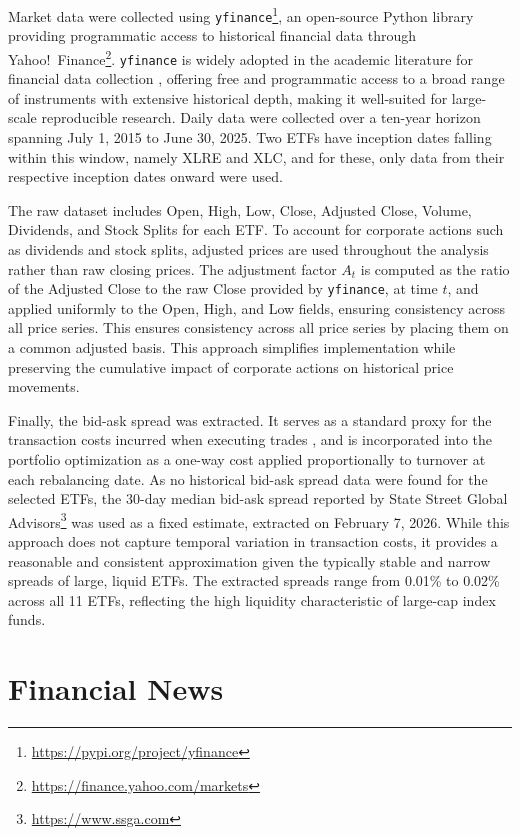 Market data were collected using \texttt{yfinance}\footnote{\url{https://pypi.org/project/yfinance}}, an open-source Python library providing programmatic access to historical financial data through Yahoo!\ Finance\footnote{\url{https://finance.yahoo.com/markets}}. \texttt{yfinance} is widely adopted in the academic literature for financial data collection \cite{e6ca3, 93d76, b58bb}, offering free and programmatic access to a broad range of instruments with extensive historical depth, making it well-suited for large-scale reproducible research. Daily data were collected over a ten-year horizon spanning July 1, 2015 to June 30, 2025. Two ETFs have inception dates falling within this window, namely XLRE and XLC, and for these, only data from their respective inception dates onward were used.

The raw dataset includes Open, High, Low, Close, Adjusted Close, Volume, Dividends, and Stock Splits for each ETF. To account for corporate actions such as dividends and stock splits, adjusted prices are used throughout the analysis rather than raw closing prices. The adjustment factor $A_{t}$ is computed as the ratio of the Adjusted Close to the raw Close provided by \texttt{yfinance}, at time $t$, and applied uniformly to the Open, High, and Low fields, ensuring consistency across all price series. This ensures consistency across all price series by placing them on a common adjusted basis. This approach simplifies implementation while preserving the cumulative impact of corporate actions on historical price movements.

Finally, the bid-ask spread was extracted. It serves as a standard proxy for the transaction  costs incurred when executing trades \cite{hill2015etf, bidask09}, and is incorporated into the portfolio optimization as a one-way cost applied proportionally to turnover at each rebalancing date. As no historical bid-ask spread data were found for the selected ETFs, the 30-day median bid-ask spread reported by State Street Global Advisors\footnote{\url{https://www.ssga.com}} was used as a fixed estimate, extracted on February 7, 2026. While this approach does not capture temporal variation in transaction costs, it provides a reasonable and consistent approximation given the typically stable and narrow spreads of large, liquid ETFs. The extracted spreads range from 0.01\% to 0.02\% across all 11 ETFs, reflecting the high liquidity characteristic of large-cap index funds.



\section{Financial News}
\label{sec:gdelt}


